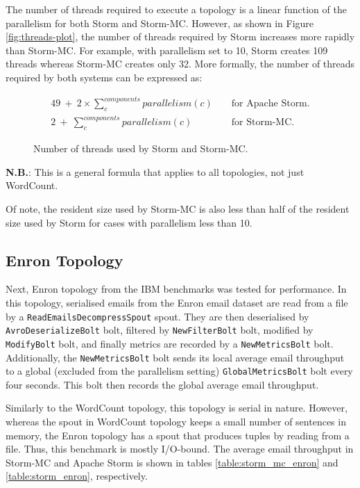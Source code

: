 The number of threads required to execute a topology is a linear function of the parallelism for both Storm and Storm-MC. However, as shown in Figure \ref{fig:threads-plot}, the number of threads required by Storm increases more rapidly than Storm-MC. For example, with parallelism set to 10, Storm creates 109 threads whereas Storm-MC creates only 32. More formally, the number of threads required by both systems can be expressed as:

\begin{figure}[!htb]
\begin{eqnarray*}
	49 \ + \ 2 \times \sum\limits_{c}^{components} parallelism(c) && \text{ for Apache Storm.} \\
	2 \ + \ \sum\limits_{c}^{components} parallelism(c) && \text{ for Storm-MC.}
\end{eqnarray*}
\caption{Number of threads used by Storm and Storm-MC.}
\end{figure}

\textbf{N.B.}\@\xspace: This is a general formula that applies to all topologies, not just WordCount.

Of note, the resident size used by Storm-MC is also less than half of the resident size used by Storm for cases with parallelism less than 10.

\subsection{Enron Topology}

Next, Enron topology from the IBM benchmarks was tested for performance. In this topology, serialised emails from the Enron email dataset are read from a file by a \texttt{ReadEmailsDecompressSpout} spout. They are then deserialised by \texttt{AvroDeserializeBolt} bolt, filtered by \texttt{NewFilterBolt} bolt, modified by \texttt{ModifyBolt} bolt, and finally metrics are recorded by a \texttt{NewMetricsBolt} bolt. Additionally, the \texttt{NewMetricsBolt} bolt sends its local average email throughput to a global (excluded from the parallelism setting) \texttt{GlobalMetricsBolt} bolt every four seconds. This bolt then records the global average email throughput.

Similarly to the WordCount topology, this topology is serial in nature. However, whereas the spout in  WordCount topology keeps a small number of sentences in memory, the Enron topology has a spout that produces tuples by reading from a file. Thus, this benchmark is mostly I/O-bound. The average email throughput in Storm-MC and Apache Storm is shown in tables \ref{table:storm_mc_enron} and \ref{table:storm_enron}, respectively. 

